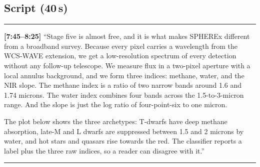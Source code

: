 \documentclass[11pt,a4paper]{article}
\begin{document}
\begin{center}
\end{center}

\subsection*{Script (40\,s)}
\noindent\rule{\linewidth}{0.3pt}\par\smallskip\noindent
\textbf{[7:45--8:25]} ``Stage five is almost free, and it is what makes SPHEREx different from a
broadband survey. Because every pixel carries a wavelength from the WCS-WAVE extension, we get a
low-resolution spectrum of every detection without any follow-up telescope. We measure flux in a
two-pixel aperture with a local annulus background, and we form three indices: methane, water, and
the NIR slope. The methane index is a ratio of two narrow bands around 1.6 and 1.74 microns. The water
index combines four bands across the 1.5-to-3-micron range. And the slope is just the log ratio of
four-point-six to one micron.

The plot below shows the three archetypes: T-dwarfs have deep methane absorption, late-M and L
dwarfs are suppressed between 1.5 and 2 microns by water, and hot stars and quasars rise towards the
red. The classifier reports a label plus the three raw indices, so a reader can disagree with it.''
\par\smallskip\noindent\rule{\linewidth}{0.3pt}
\end{document}
